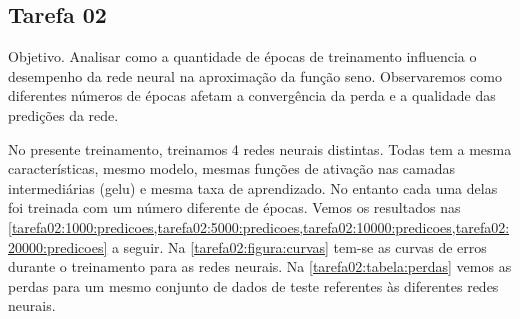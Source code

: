 \subsection{Tarefa 02}

\begin{comandoquestao}
    Objetivo. Analisar como a quantidade de épocas de treinamento influencia o desempenho da rede neural na aproximação da função seno. Observaremos como diferentes números de épocas afetam a convergência da perda e a qualidade das predições da rede.
\end{comandoquestao}

No presente treinamento, treinamos 4 redes neurais distintas. Todas tem a mesma 
características, mesmo modelo, mesmas funções de ativação nas camadas 
intermediárias (gelu) e mesma taxa de aprendizado. No entanto cada uma delas 
foi treinada com um número diferente de épocas. Vemos os resultados nas 
\cref{tarefa02:1000:predicoes,tarefa02:5000:predicoes,tarefa02:10000:predicoes,tarefa02:20000:predicoes}
 a seguir. Na \cref{tarefa02:figura:curvas} tem-se as curvas de erros durante o 
treinamento para as redes neurais. Na \cref{tarefa02:tabela:perdas} vemos as 
perdas para um mesmo conjunto de dados de teste referentes às diferentes redes 
neurais.


